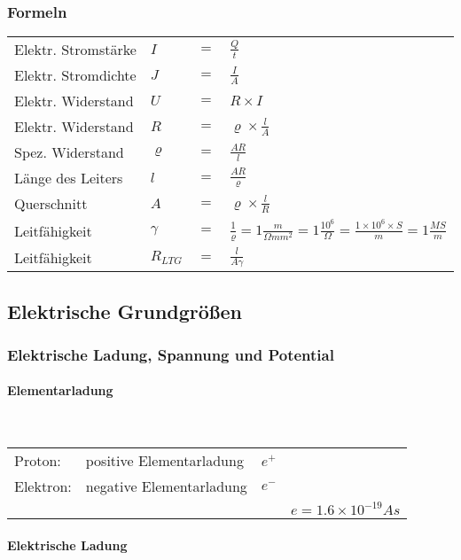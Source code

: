\subsubsection{Formeln}
\begin{tabular}{llll}
Elektr. Stromstärke	& $I$ & $=$ & $\frac{Q}{t}$\\
Elektr. Stromdichte	& $J$ & $=$ & $\frac{I}{A}$\\
Elektr. Widerstand 	& $U$ & $=$ & $R\times I$\\
Elektr. Widerstand	& $R$ & $=$ & $\varrho\times\frac{l}{A}$\\
Spez. Widerstand		& $\varrho$	& $=$ & $\frac{AR}{l}$\\
Länge des Leiters	& $l$		& $=$ & $\frac{AR}{\varrho}$\\
Querschnitt			& $A$		& $=$ & $\varrho\times\frac{l}{R}$\\
Leitfähigkeit		& $\gamma$	& $=$ & $\frac{1}{\varrho} = 1\frac{m}{\Omega mm^2} = 1\frac{10^6}{\Omega} = \frac{1\times 10^6\times S}{m} = 1\frac{MS}{m}$\\
Leitfähigkeit		& $R_{LTG}$ 	& $=$ & $\frac{l}{A\gamma}$\\
\end{tabular}


\subsection{Elektrische Grundgrößen}
	\subsubsection{Elektrische Ladung, Spannung und Potential}
		\paragraph{Elementarladung}~\\
		
\begin{tabular}{llll}
Proton:		& positive Elementarladung &	$e^+$ & \\
Elektron:	& negative Elementarladung &	$e^-$ & \\
& &	& $e = 1.6 \times 10^{-19} As$ \\
\end{tabular}

		\paragraph{Elektrische Ladung}~\\
		
